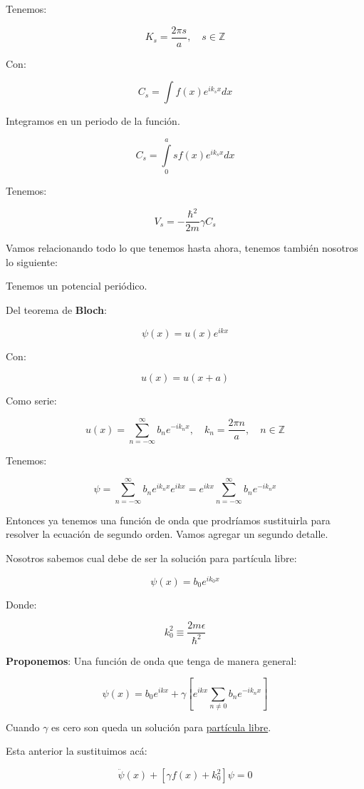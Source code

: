\documentclass{article}
\begin{document}
Tenemos:


\[ K_{s} = \frac{2\pi s}{a}, \quad s\in \mathbb{Z} \]

Con:


\[ C_{s} = \int\limits f(x) e^{ik_{s}x}dx \]

Integramos en un periodo de la función. 


\[ C_{s} = \int\limits_{0}^{a} s f(x) e^{ik_{s}x}dx \]


Tenemos:


\[ V_{s} = - \frac{ \hbar^{2} }{2m} \gamma C_{s} \]

Vamos relacionando todo lo que tenemos hasta ahora, tenemos también nosotros lo siguiente:


Tenemos un potencial periódico. 


Del teorema de \textbf{Bloch}:


\[  \psi (x) = u(x) e^{ikx}  \]

Con:


\[  u(x) = u(x+a) \]


Como serie:

\[ u(x) = \sum\limits_{n=-\infty}^{\infty} b_{n}e^{-ik_{n}x}, \quad k_{n} = \frac{2\pi n}{a}, \quad n \in \mathbb{Z} \]




Tenemos:

\[ \psi = \sum\limits_{n=-\infty}^{\infty} b_{n}e^{ik_{n}x} e^{ikx} = e^{ikx}\sum\limits_{n=-\infty}^{\infty} b_{n}e^{-ik_{n}x} \]

Entonces ya tenemos una función de onda que prodríamos sustituirla para resolver la ecuación de segundo orden. Vamos agregar un segundo detalle. 

Nosotros sabemos cual debe de ser la solución para partícula libre:


\[ \psi(x) =b_{0}e^{ik_{0}x} \]


Donde:


\[ k_{0}^{2} \equiv \frac{2m\epsilon}{\hbar^{2}} \]


\textbf{Proponemos}: Una función de onda que tenga de manera general:

\[  \psi(x) = b_{0}e^{ikx} + \gamma \left[  e^{ikx} \sum\limits_{n\neq 0} b_{n} e^{-ik_{n}x}\right] \]

Cuando $\gamma$ es cero son queda un solución para \underline{partícula libre}.

Esta anterior la sustituimos acá:

\[ \ddot{\psi}(x) + \left[ \gamma f(x) + k_{0}^{2} \right] \psi =0 \]
\end{document}
